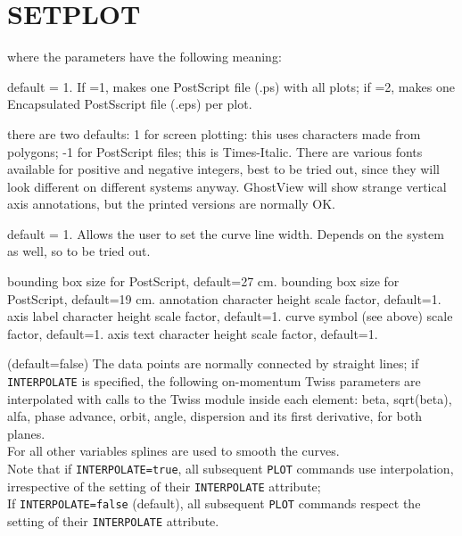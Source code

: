 \section{SETPLOT}
\label{sec:setplot}

where the parameters have the following meaning: 
\begin{madlist}
    default = 1. If =1, makes one PostScript file (.ps) with
     all plots; if =2, makes one Encapsulated PostSscript file (.eps)
     per plot.   

    there are two defaults: 1 for screen plotting: this uses
     characters made from polygons; -1 for PostScript files; this is
     Times-Italic. There are various fonts available for positive and
     negative integers, best to be tried out, since they will look
     different on different systems anyway. GhostView will show strange
     vertical axis annotations, but the printed versions are normally
     OK.   

    default = 1. Allows the user to set the curve line
     width.  Depends on the system as well, so to be tried out.   

    bounding box size for PostScript, default=27 cm.   
    bounding box size for PostScript, default=19 cm.   
    annotation character height scale factor, default=1.   
    axis label character height scale factor, default=1.  
    curve symbol (see above) scale factor, default=1.  
    axis text character height scale factor, default=1.  

    (default=false) The data points are
     normally connected by straight lines; if \texttt{INTERPOLATE} is
     specified, the following on-momentum Twiss parameters are
     interpolated with calls to the Twiss module inside 
     each element:  beta, sqrt(beta), alfa, phase advance, orbit, angle,
     dispersion and its first derivative, for both planes. \\ 
     For all other variables splines are used to smooth the curves. \\  
     Note that if \texttt{INTERPOLATE=true}, all subsequent \texttt{PLOT} 
     commands use interpolation, irrespective of the setting of their 
     \texttt{INTERPOLATE} attribute; \\
     If \texttt{INTERPOLATE=false} (default), all subsequent \texttt{PLOT} 
     commands respect the setting of their \texttt{INTERPOLATE} attribute.
\end{madlist}


